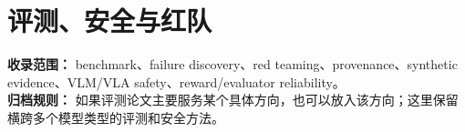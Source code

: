 
\section*{评测、安全与红队}
{}

\begin{conceptbox}
\textbf{收录范围：} benchmark、failure discovery、red teaming、provenance、synthetic evidence、VLM/VLA safety、reward/evaluator reliability。\\
\textbf{归档规则：} 如果评测论文主要服务某个具体方向，也可以放入该方向；这里保留横跨多个模型类型的评测和安全方法。
\end{conceptbox}

